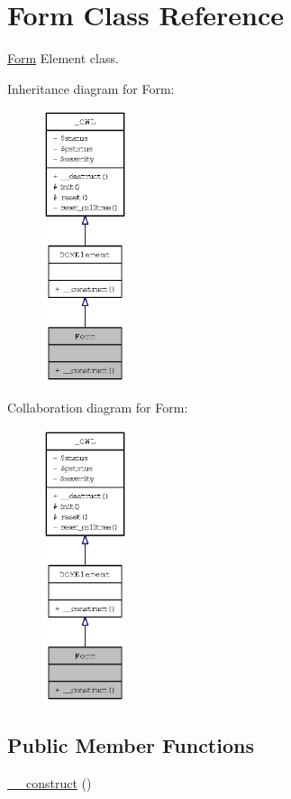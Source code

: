 \hypertarget{classForm}{
\section{Form Class Reference}
\label{classForm}
}
\hyperlink{classForm}{Form} Element class.  


Inheritance diagram for Form:\nopagebreak
\begin{figure}[H]
\begin{center}
\leavevmode
\includegraphics[width=70pt]{classForm__inherit__graph}
\end{center}
\end{figure}
Collaboration diagram for Form:\nopagebreak
\begin{figure}[H]
\begin{center}
\leavevmode
\includegraphics[width=70pt]{classForm__coll__graph}
\end{center}
\end{figure}
\subsection*{Public Member Functions}
\begin{CompactItemize}
\item 
\hyperlink{classForm_47e154733dffd6b61a74f4d2f6498f8c}{\_\-\_\-construct} ()
\end{CompactItemize}
